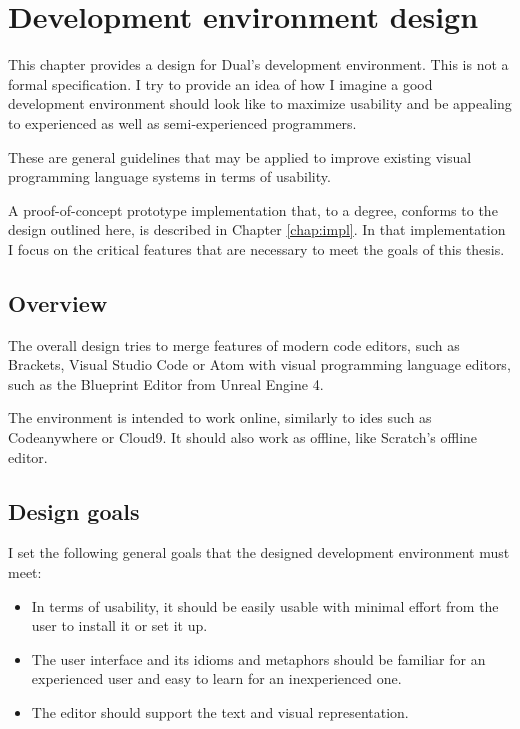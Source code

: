\chapter{Development environment design}\label{chap:editor}
This chapter provides a design for Dual's development environment. This is not a formal specification. I try to provide an idea of how I imagine a good development environment should look like to maximize usability and be appealing to experienced as well as semi-experienced programmers.

These are general guidelines that may be applied to improve existing visual programming language systems in terms of usability.

A proof-of-concept prototype implementation that, to a degree, conforms to the design outlined here, is described in Chapter \ref{chap:impl}. In that implementation I focus on the critical features that are necessary to meet the goals of this thesis.

\section{Overview}
The overall design tries to merge features of modern code editors, such as Brackets\cite{brackets_site}, Visual Studio Code\cite{vscode_site} or Atom\cite{atom_site} with visual programming language editors, such as the Blueprint Editor from Unreal Engine 4\cite{blueprint_editor}.

The environment is intended to work online, similarly to \acrlong{ide}s such as Codeanywhere\cite{codeanywhere_website} or Cloud9\cite{c9_website}. It should also work as offline, like Scratch's offline editor\cite{scratch_offline}.

\section{Design goals}
I set the following general goals that the designed development environment must meet:
\begin{itemize}
\item In terms of usability, it should be easily usable with minimal effort from the user to install it or set it up.
\item The user interface and its idioms and metaphors\cite{ui_idioms} should be familiar for an experienced user and easy to learn for an inexperienced one.
\item The editor should support the text and visual representation.
\end{itemize}

